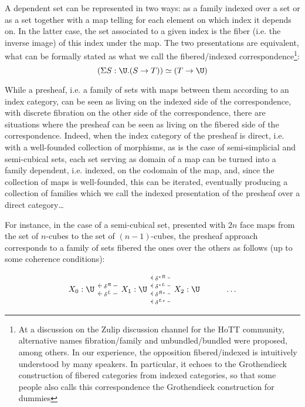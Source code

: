 \documentclass{msc}
\newcommand{\kstar}{{\star}}
\begin{document}
A dependent set can be represented in two ways: as a family indexed over a set or as a set together with a map telling for each element on which index it depends on. In the latter case, the set associated to a given index is the fiber (i.e. the inverse image) of this index under the map. The two presentations are equivalent, what can be formally stated as what we call the fibered/indexed correspondence\footnote{At a discussion on the Zulip discussion channel for the HoTT community, alternative names fibration/family and unbundled/bundled were proposed, among others. In our experience, the opposition fibered/indexed is intuitively understood by many speakers. In particular, it echoes to the Grothendieck construction of fibered categories from indexed categories, so that some people also calls this correspondence the Grothendieck construction for dummies}:
$$(\Sigma S: \U. (S \rightarrow T)) \simeq (T \rightarrow \U)$$

While a presheaf, i.e. a family of sets with maps between them according to an index category, can be seen as living on the indexed side of the correspondence, with discrete fibration on the other side of the correspondence, there are situations where the presheaf can be seen as living on the fibered side of the correspondence.
Indeed, when the index category of the presheaf is direct, i.e. with a well-founded collection of morphisms, as is the case of semi-simplicial and semi-cubical sets, each set serving as domain of a map can be turned into a family dependent, i.e. indexed, on the codomain of the map, and, since the collection of maps is well-founded, this can be iterated, eventually producing a collection of families which we call the indexed presentation of the presheaf over a direct category\dots

For instance, in the case of a semi-cubical set, presented with $2n$ face maps from the set of $n$-cubes to the set of $(n-1)$-cubes, the presheaf approach corresponds to a family of sets fibered the ones over the others as follows (up to some coherence conditions):

\begin{equation*}
  \begin{tikzcd}
    X_0: \U & X_1: \U \arrow[l, "\delta^L" description, shift left=2] \arrow[l, "\delta^R" description, shift right=2] & X_2: \U \arrow[l, "\delta^{L\kstar}" description, shift left=6] \arrow[l, "\delta^{R\kstar}" description, shift left=2] \arrow[l, "\delta^{\kstar L}" description, shift right=2] \arrow[l, "\delta^{\kstar R}" description, shift right=6] & \ldots
  \end{tikzcd}
\end{equation*}
\end{document}
